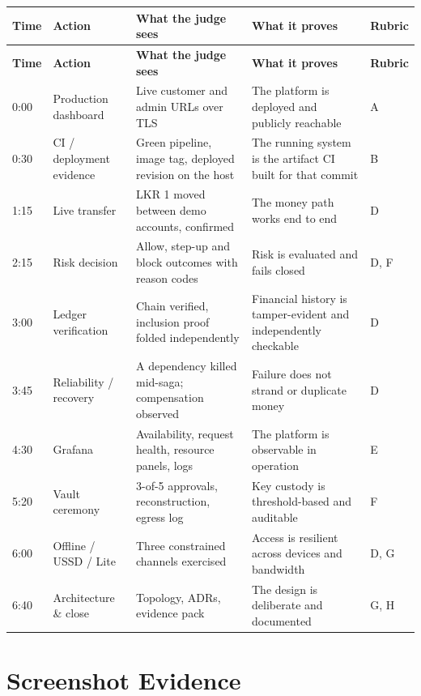 \documentclass[11pt,a4paper]{article}
\begin{document}
\begin{center}
\begin{longtable}{@{}p{11mm}p{31mm}p{40mm}p{40mm}p{10mm}@{}}
\toprule
\textbf{Time} & \textbf{Action} & \textbf{What the judge sees} & \textbf{What it proves} & \textbf{Rubric}\\
\midrule
\endfirsthead
\toprule
\textbf{Time} & \textbf{Action} & \textbf{What the judge sees} & \textbf{What it proves} & \textbf{Rubric}\\
\midrule
\endhead
0:00 & Production dashboard & Live customer and admin URLs over TLS & The platform is deployed and publicly reachable & A\\
0:30 & CI / deployment evidence & Green pipeline, image tag, deployed revision on the host & The running system is the artifact CI built for that commit & B\\
1:15 & Live transfer & LKR 1 moved between demo accounts, confirmed & The money path works end to end & D\\
2:15 & Risk decision & Allow, step-up and block outcomes with reason codes & Risk is evaluated and fails closed & D, F\\
3:00 & Ledger verification & Chain verified, inclusion proof folded independently & Financial history is tamper-evident and independently checkable & D\\
3:45 & Reliability / recovery & A dependency killed mid-saga; compensation observed & Failure does not strand or duplicate money & D\\
4:30 & Grafana & Availability, request health, resource panels, logs & The platform is observable in operation & E\\
5:20 & Vault ceremony & 3-of-5 approvals, reconstruction, egress log & Key custody is threshold-based and auditable & F\\
6:00 & Offline / USSD / Lite & Three constrained channels exercised & Access is resilient across devices and bandwidth & D, G\\
6:40 & Architecture \& close & Topology, ADRs, evidence pack & The design is deliberate and documented & G, H\\
\bottomrule
\end{longtable}
\end{center}

\section{Screenshot Evidence}
\label{sec:evidence}
\end{document}
